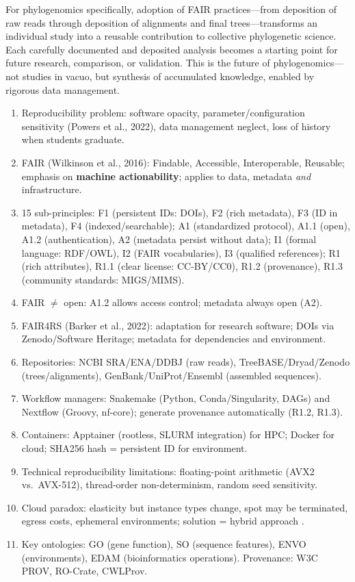 For phylogenomics specifically, adoption of FAIR practices---from deposition of raw reads through deposition of alignments and final trees---transforms an individual study into a reusable contribution to collective phylogenetic science. Each carefully documented and deposited analysis becomes a starting point for future research, comparison, or validation. This is the future of phylogenomics---not studies in vacuo, but synthesis of accumulated knowledge, enabled by rigorous data management.

\clearpage
\begin{revise}\small
\begin{enumerate}[itemsep=0pt, topsep=0pt, parsep=0pt]
    \item Reproducibility problem: software opacity, parameter/configuration sensitivity (Powers et al., 2022), data management neglect, loss of history when students graduate.
    \item FAIR (Wilkinson et al., 2016): Findable, Accessible, Interoperable, Reusable; emphasis on \textbf{machine actionability}; applies to data, metadata \textit{and} infrastructure.
    \item 15 sub-principles: F1 (persistent IDs: DOIs), F2 (rich metadata), F3 (ID in metadata), F4 (indexed/searchable); A1 (standardized protocol), A1.1 (open), A1.2 (authentication), A2 (metadata persist without data); I1 (formal language: RDF/OWL), I2 (FAIR vocabularies), I3 (qualified references); R1 (rich attributes), R1.1 (clear license: CC-BY/CC0), R1.2 (provenance), R1.3 (community standards: MIGS/MIMS).
    \item FAIR $\neq$ open: A1.2 allows access control; metadata always open (A2).
    \item FAIR4RS (Barker et al., 2022): adaptation for research software; DOIs via Zenodo/Software Heritage; metadata for dependencies and environment.
    \item Repositories: NCBI SRA/ENA/DDBJ (raw reads), TreeBASE/Dryad/Zenodo (trees/alignments), GenBank/UniProt/Ensembl (assembled sequences).
    \item Workflow managers: Snakemake (Python, Conda/Singularity, DAGs) and Nextflow (Groovy, nf-core); generate provenance automatically (R1.2, R1.3).
    \item Containers: Apptainer (rootless, SLURM integration) for HPC; Docker for cloud; SHA256 hash = persistent ID for environment.
    \item Technical reproducibility limitations: floating-point arithmetic (AVX2 vs.\ AVX-512), thread-order non-determinism, random seed sensitivity.
    \item Cloud paradox: elasticity but instance types change, spot may be terminated, egress costs, ephemeral environments; solution = hybrid approach \parencite{langmead2018}.
    \item Key ontologies: GO (gene function), SO (sequence features), ENVO (environments), EDAM (bioinformatics operations). Provenance: W3C PROV, RO-Crate, CWLProv.
\end{enumerate}
\end{revise}

\clearpage

\printbibliography[heading=subbibliography,title={References}]

